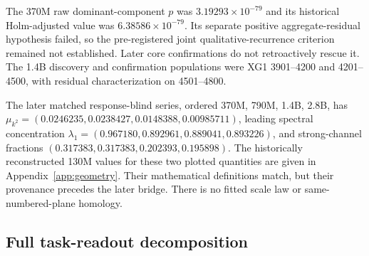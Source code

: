 \begin{table}[h]
\centering\small
\caption{Scale-local causal-role tests. Each row has a positive frozen
endpoint, but the historical 370M joint residual criterion remains failed.}
\label{tab:scale}
\end{table}

The 370M raw dominant-component $p$ was
$3.19293\times10^{-79}$ and its historical Holm-adjusted value was
$6.38586\times10^{-79}$. Its separate positive aggregate-residual
hypothesis failed, so the pre-registered joint qualitative-recurrence
criterion remained not established. Later core confirmations do not
retroactively rescue it. The 1.4B discovery and confirmation populations
were XG1 3901--4200 and 4201--4500, with residual characterization on
4501--4800.

The later matched response-blind series, ordered 370M, 790M, 1.4B, 2.8B, has
$\mu_{k^2}=(0.0246235,0.0238427,0.0148388,0.00985711)$,
leading spectral concentration
$\lambda_1=(0.967180,0.892961,0.889041,0.893226)$,
and strong-channel fractions
$(0.317383,0.317383,0.202393,0.195898)$.
The historically reconstructed 130M values for these two plotted
quantities are given in Appendix~\ref{app:geometry}. Their mathematical
definitions match, but their provenance precedes the later bridge.
There is no fitted scale law or same-numbered-plane homology.

\subsection{Full task-readout decomposition}
\label{app:decomp}

